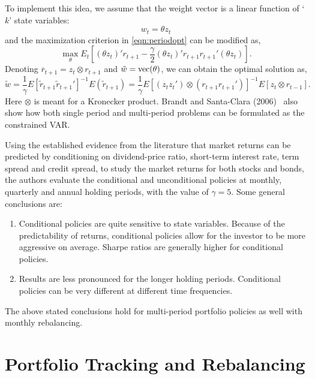 To implement this idea, we assume that the weight vector is a linear function of `$k$' state variables:
	\begin{equation} \label{eqn:statevar}
	w_t= \theta z_t
	\end{equation}
and the maximization criterion in \eqref{eqn:periodopt} can be modified as,
	\begin{equation} \label{eqn:prevmodified}
	\max_\theta E_t\left[(\theta z_t)' r_{t+1} - \frac{\gamma}{2}(\theta z_t)' r_{t+1} r_{t+1}' (\theta z_t)\right].
	\end{equation}
Denoting $\overline{r}_{t+1}= z_t \otimes r_{t+1}$ and $\tilde{w}= \operatorname{vec}(\theta)$, we can obtain the optimal solution as,
	\begin{equation} \label{eqn:modifiedsolution}
	\tilde{w}= \frac{1}{\gamma} E[\tilde{r}_{t+1} \tilde{r}_{t+1}']^{-1} E(\tilde{r}_{t+1})= \frac{1}{\gamma} E[(z_t z_t') \otimes (r_{t+1}r_{t+1}')]^{-1} E[z_t \otimes r_{t-1}].
	\end{equation}
Here $\otimes$ is meant for a Kronecker product. Brandt and Santa-Clara (2006)~\cite{bransc} also show how both single period and multi-period problems can be formulated as the constrained VAR. 


Using the established evidence from the literature that market returns can be predicted by conditioning on dividend-price ratio, short-term interest rate, term spread and credit spread, to study the market returns for both stocks and bonds, the authors evaluate the conditional and unconditional policies at monthly, quarterly and annual holding periods, with the value of $\gamma= 5$. Some general conclusions are:
	\begin{enumerate}[--]
	\item Conditional policies are quite sensitive to state variables. Because of the predictability of returns, conditional policies allow for the investor to be more aggressive on average. Sharpe ratios are generally higher for conditional policies.
	\item Results are less pronounced for the longer holding periods. Conditional policies can be very different at different time frequencies. 
	\end{enumerate}
The above stated conclusions hold for multi-period portfolio policies as well with monthly rebalancing. 



\section{Portfolio Tracking and Rebalancing}


